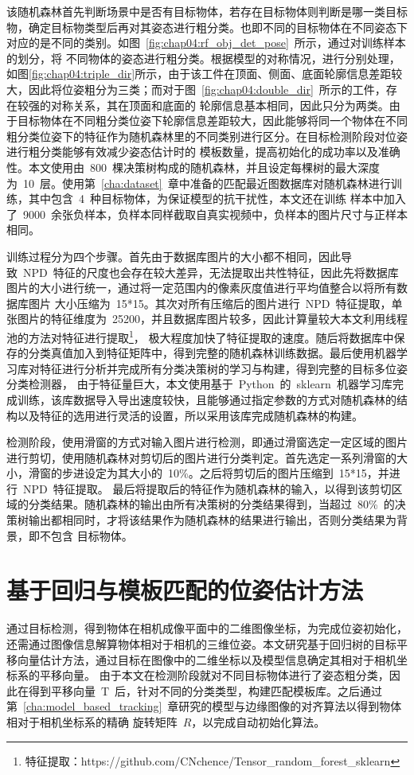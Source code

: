 该随机森林首先判断场景中是否有目标物体，若存在目标物体则判断是哪一类目标物，确定目标物类型后再对其姿态进行粗分类。也即不同的目标物体在不同姿态下对应的是不同的类别。如图~\ref{fig:chap04:rf_obj_det_pose}~所示，通过对训练样本的划分，将
不同物体的姿态进行粗分类。根据模型的对称情况，进行分别处理，如图\ref{fig:chap04:triple_dir}所示，由于该工件在顶面、侧面、底面轮廓信息差距较大，因此将位姿粗分为三类；而对于图~\ref{fig:chap04:double_dir}~所示的工件，存在较强的对称关系，其在顶面和底面的
轮廓信息基本相同，因此只分为两类。由于目标物体在不同粗分类位姿下轮廓信息差距较大，因此能够将同一个物体在不同粗分类位姿下的特征作为随机森林里的不同类别进行区分。在目标检测阶段对位姿进行粗分类能够有效减少姿态估计时的
模板数量，提高初始化的成功率以及准确性。本文使用由~800~棵决策树构成的随机森林，并且设定每棵树的最大深度为~10~层。使用第~\ref{cha:dataset}~章中准备的匹配最近图数据库对随机森林进行训练，其中包含~4~种目标物体，为保证模型的抗干扰性，本文还在训练
样本中加入了~9000~余张负样本，负样本同样截取自真实视频中，负样本的图片尺寸与正样本相同。

训练过程分为四个步骤。首先由于数据库图片的大小都不相同，因此导致~NPD~特征的尺度也会存在较大差异，无法提取出共性特征，因此先将数据库图片的大小进行统一，通过将一定范围内的像素灰度值进行平均值整合以将所有数据库图片
大小压缩为~15*15。其次对所有压缩后的图片进行~NPD~特征提取，单张图片的特征维度为~25200，并且数据库图片较多，因此计算量较大本文利用线程池的方法对特征进行提取\footnote{特征提取：https://github.com/CNchence/Tensor\_random\_forest\_sklearn}，
极大程度加快了特征提取的速度。随后将数据库中保存的分类真值加入到特征矩阵中，得到完整的随机森林训练数据。最后使用机器学习库对特征进行分析并完成所有分类决策树的学习与构建，得到完整的目标多位姿分类检测器，
由于特征量巨大，本文使用基于~Python~的~sklearn~机器学习库完成训练，该库数据导入导出速度较快，且能够通过指定参数的方式对随机森林的结构以及特征的选用进行灵活的设置，所以采用该库完成随机森林的构建。

检测阶段，使用滑窗的方式对输入图片进行检测，即通过滑窗选定一定区域的图片进行剪切，使用随机森林对剪切后的图片进行分类判定。首先选定一系列滑窗的大小，滑窗的步进设定为其大小的~10\%。之后将剪切后的图片压缩到~15*15，并进行~NPD~特征提取。
最后将提取后的特征作为随机森林的输入，以得到该剪切区域的分类结果。随机森林的输出由所有决策树的分类结果得到，当超过~80\%~的决策树输出都相同时，才将该结果作为随机森林的结果进行输出，否则分类结果为背景，即不包含
目标物体。



\section{基于回归与模板匹配的位姿估计方法}
\label{sec:template_matching}
通过目标检测，得到物体在相机成像平面中的二维图像坐标，为完成位姿初始化，还需通过图像信息解算物体相对于相机的三维位姿。本文研究基于回归树的目标平移向量估计方法，通过目标在图像中的二维坐标以及模型信息确定其相对于相机坐标系的平移向量。
由于本文在检测阶段就对不同目标物体进行了姿态粗分类，因此在得到平移向量~$\textrm{T}$~后，针对不同的分类类型，构建匹配模板库。之后通过第~\ref{cha:model_based_tracking}~章研究的模型与边缘图像的对齐算法以得到物体相对于相机坐标系的精确
旋转矩阵~$R$，以完成自动初始化算法。

